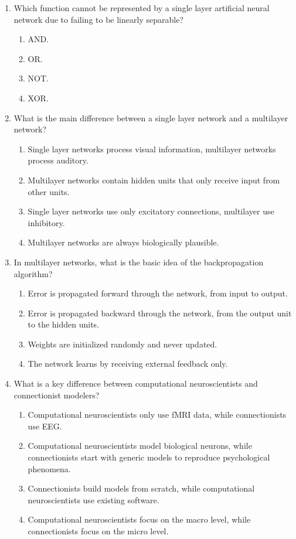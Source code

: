 \documentclass{article}
\begin{document}
\begin{enumerate}[label=\arabic*.]
\item Which function cannot be represented by a single layer artificial neural network due to failing to be linearly separable?
\begin{enumerate}[label=(\alph*)]
    \item AND.
    \item OR.
    \item NOT.
    \item XOR.
\end{enumerate}

\item What is the main difference between a single layer network and a multilayer network?
\begin{enumerate}[label=(\alph*)]
    \item Single layer networks process visual information, multilayer networks process auditory.
    \item Multilayer networks contain hidden units that only receive input from other units.
    \item Single layer networks use only excitatory connections, multilayer use inhibitory.
    \item Multilayer networks are always biologically plausible.
\end{enumerate}

\item In multilayer networks, what is the basic idea of the backpropagation algorithm?
\begin{enumerate}[label=(\alph*)]
    \item Error is propagated forward through the network, from input to output.
    \item Error is propagated backward through the network, from the output unit to the hidden units.
    \item Weights are initialized randomly and never updated.
    \item The network learns by receiving external feedback only.
\end{enumerate}

\item What is a key difference between computational neuroscientists and connectionist modelers?
\begin{enumerate}[label=(\alph*)]
    \item Computational neuroscientists only use fMRI data, while connectionists use EEG.
    \item Computational neuroscientists model biological neurons, while connectionists start with generic models to reproduce psychological phenomena.
    \item Connectionists build models from scratch, while computational neuroscientists use existing software.
    \item Computational neuroscientists focus on the macro level, while connectionists focus on the micro level.
\end{enumerate}


\end{enumerate}
\end{document}
